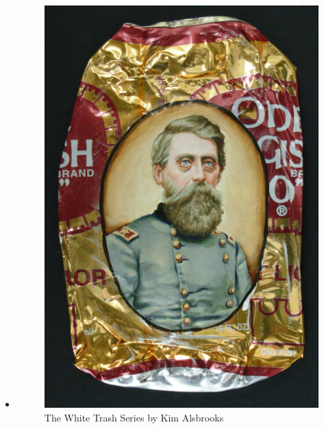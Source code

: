 \begin{itemize}
\item
\parbox[t]{
	\dimexpr\textwidth-\leftmargin}{%
      \vspace{-2.5mm}
      \begin{figure}
        \centering
        \vspace{-\baselineskip}
        \includegraphics[width=\linewidth]{graphics/Alsbrooks.jpg}
        \caption{The White Trash Series by Kim Alsbrooks}
      \end{figure}
}
\end{itemize}

